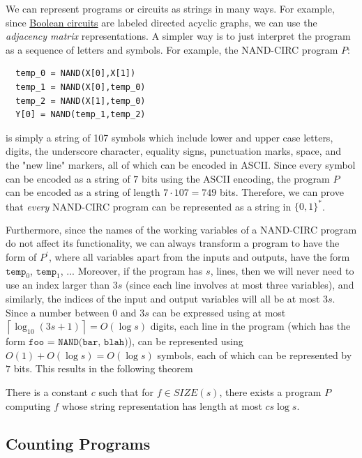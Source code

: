   We can represent programs or circuits as strings in many ways. For example, since \hyperref[def:boolean-circuit]{Boolean circuits} are labeled directed acyclic graphs, we can use the \textit{adjacency matrix} representations. A simpler way is to just interpret the program as a sequence of letters and symbols. For example, the NAND-CIRC program $P$: 
  \begin{lstlisting}
  temp_0 = NAND(X[0],X[1])
  temp_1 = NAND(X[0],temp_0)
  temp_2 = NAND(X[1],temp_0)
  Y[0] = NAND(temp_1,temp_2)
  \end{lstlisting}
  is simply a string of 107 symbols which include lower and upper case letters, digits, the underscore character, equality signs, punctuation marks, space, and the "new line" markers, all of which can be encoded in ASCII. Since every symbol can be encoded as a string of $7$ bits using the ASCII encoding, the program $P$ can be encoded as a string of length $7 \cdot 107 = 749$ bits. Therefore, we can prove that \textit{every} NAND-CIRC program can be represented as a string in $\{0,1\}^*$. 

  Furthermore, since the names of the working variables of a NAND-CIRC program do not affect its functionality, we can always transform a program to have the form of $P^\prime$, where all variables apart from the inputs and outputs, have the form $\texttt{temp}_0$, $\texttt{temp}_1$, ... Moreover, if the program has $s$, lines, then we will never need to use an index larger than $3s$ (since each line involves at most three variables), and similarly, the indices of the input and output variables will all be at most $3s$. Since a number between $0$ and $3s$ can be expressed using at most $\left\lceil{\log_{10} (3s+1)} \right\rceil = O(\log s)$ digits, each line in the program (which has the form $\texttt{foo = NAND(bar, blah)}$), can be represented using $O(1) + O(\log s) = O(\log s)$ symbols, each of which can be represented by $7$ bits. This results in the following theorem 

  \begin{theorem}
    \label{thm:representing-programs-as-strings}
  There is a constant $c$ such that for $f \in SIZE(s)$, there exists a program $P$ computing $f$ whose string representation has length at most $cs \log s$. 
  \end{theorem}

\subsection{Counting Programs}

